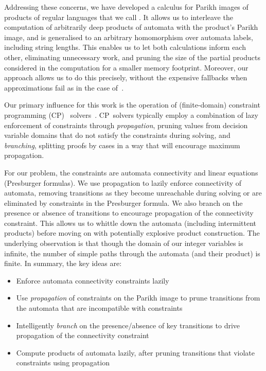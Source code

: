 Addressing these concerns, we have developed a calculus for Parikh images of
products of regular languages that we call \Calculus{}. It allows us to
interleave the computation of arbitrarily deep products of automata with the
product's Parikh image, and is generalised to an arbitrary homomorphism over
automata labels, including string lengths. This enables us to let both
calculations inform each other, eliminating unnecessary work, and pruning the
size of the partial products considered in the computation for a smaller memory
footprint. Moreover, our approach allows us to do this precisely, without the expensive
fallbacks when approximations fail as in the case of~\cite{approximate-parikh}.

Our primary influence for this work is the operation of (finite-domain) 
constraint programming (CP)%
~solvers~\cite{cp}. CP~solvers typically employ a combination of lazy enforcement
of constraints through \emph{propagation},
pruning values from decision variable domains that do not satisfy 
the constraints during solving, and \emph{branching}, splitting proofs
by cases in a way that will encourage maximum propagation.

For our problem, the constraints are automata connectivity and linear
equations (Presburger formulas).
We use propagation to lazily enforce connectivity of automata,
removing transitions as they become unreachable during solving or are
eliminated by constraints in the Presburger formula. We
also branch on the presence or absence of transitions to
encourage propagation of the connectivity constraint. This allows
us to whittle down the automata
(including intermittent products) before moving on with potentially
 explosive product construction. The underlying observation
is that though the domain of our integer variables
is infinite, the number of simple paths
through the automata (and their product) is finite. In summary, the key ideas are:

{
    \centering
    \begin{tcolorbox}[colback=ourcolour!5!white,colframe=ourcolour!75!black,%
        title=Key ideas of \Calculus{},%
        width=0.8\linewidth]

        \begin{itemize}
            \item Enforce automata connectivity constraints lazily
            \item Use \emph{propagation} of constraints on the Parikh image to prune
            transitions from the automata that are incompatible with constraints
            \item Intelligently \emph{branch} on the presence\slash{}absence of key
             transitions to drive propagation of the connectivity constraint
             \item Compute products of automata lazily, after pruning transitions
             that violate constraints using propagation
        \end{itemize}
    \end{tcolorbox}
  }


